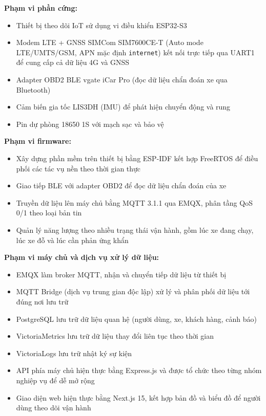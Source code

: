 \documentclass[a4paper]{extarticle}
\providecommand{\tightlist}{%
  \setlength{\itemsep}{0pt}\setlength{\parskip}{0pt}}
\begin{document}
\textbf{Phạm vi phần cứng:}

\begin{itemize}
\tightlist
\item
  Thiết bị theo dõi IoT sử dụng vi điều khiển ESP32-S3
\item
  Modem LTE + GNSS SIMCom SIM7600CE-T (Auto mode LTE/UMTS/GSM, APN mặc
  định \texttt{internet}) kết nối trực tiếp qua UART1 để cung cấp cả dữ
  liệu 4G và GNSS
\item
  Adapter OBD2 BLE vgate iCar Pro (đọc dữ liệu chẩn đoán xe qua
  Bluetooth)
\item
  Cảm biến gia tốc LIS3DH (IMU) để phát hiện chuyển động và rung
\item
  Pin dự phòng 18650 1S với mạch sạc và bảo vệ
\end{itemize}

\textbf{Phạm vi firmware:}

\begin{itemize}
\tightlist
\item
  Xây dựng phần mềm trên thiết bị bằng ESP-IDF kết hợp FreeRTOS để điều
  phối các tác vụ nền theo thời gian thực
\item
  Giao tiếp BLE với adapter OBD2 để đọc dữ liệu chẩn đoán của xe
\item
  Truyền dữ liệu lên máy chủ bằng MQTT 3.1.1 qua EMQX, phân tầng QoS 0/1
  theo loại bản tin
\item
  Quản lý năng lượng theo nhiều trạng thái vận hành, gồm lúc xe đang
  chạy, lúc xe đỗ và lúc cần phản ứng khẩn
\end{itemize}

\textbf{Phạm vi máy chủ và dịch vụ xử lý dữ liệu:}

\begin{itemize}
\tightlist
\item
  EMQX làm broker MQTT, nhận và chuyển tiếp dữ liệu từ thiết bị
\item
  MQTT Bridge (dịch vụ trung gian độc lập) xử lý và phân phối dữ liệu tới
  đúng nơi lưu trữ
\item
  PostgreSQL lưu trữ dữ liệu quan hệ (người dùng, xe, khách hàng, cảnh
  báo)
\item
  VictoriaMetrics lưu trữ dữ liệu thay đổi liên tục theo thời gian
\item
  VictoriaLogs lưu trữ nhật ký sự kiện
\item
  API phía máy chủ hiện thực bằng Express.js và được tổ chức theo từng
  nhóm nghiệp vụ để dễ mở rộng
\item
  Giao diện web hiện thực bằng Next.js 15, kết hợp bản đồ và biểu đồ để
  người dùng theo dõi vận hành
\end{itemize}
\end{document}
